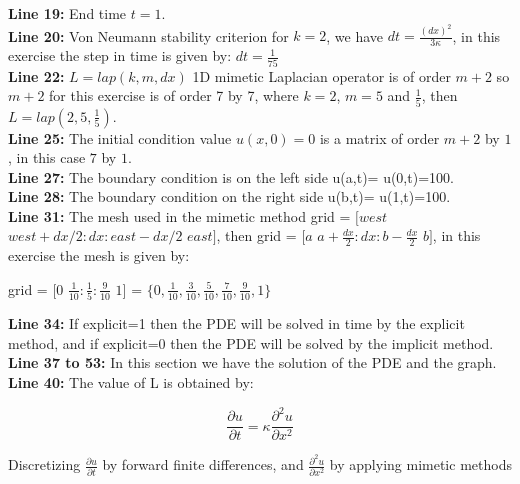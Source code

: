 \documentclass[a4paper,abstract=true]{scrreprt}
\begin{document}
\textbf{Line 19:} End time $t=1$.\\

\textbf{Line 20:} Von Neumann stability criterion for $k=2$, we have $ dt = \frac{(dx)^{2}}{3 \kappa}$, in this exercise the step in time is given by: $dt =\frac{1}{75}$\\

\textbf{Line 22:} $L = lap(k,m,dx)$ 1D mimetic Laplacian operator is of order $m+2$ so $m+2$ for this exercise is of order 7 by 7, where $k=2$, $m = 5$ and $\frac{1}{5}$, then $L = lap(2,5,\frac{1}{5})$.\\

\textbf{Line 25:} The initial condition  value $u(x,0)=0$ is a matrix of order $m+2$ by $1$, in this case $7$ by $1$.\\

\textbf{Line 27:} The boundary condition is on the left side u(a,t)= u(0,t)=100.\\

\textbf{Line 28:} The boundary condition on the right side u(b,t)= u(1,t)=100.\\

\textbf{Line 31:} The mesh used in the mimetic method  grid = $[west$  $west+dx/2: dx :east-dx/2$  $east]$, then grid = $[a$ $a+\frac{dx}{2}: dx : b-\frac{dx}{2}$ $b  ]$, in this exercise the mesh is given by:

\begin{center}

	grid = $[0$ $\frac{1}{10}: \frac{1}{5}: \frac{9}{10}$ $1]$ = $  \{0, \frac{1}{10}, \frac{3}{10}, \frac{5}{10}, \frac{7}{10}, \frac{9}{10}, 1 \}$

\end{center}

\textbf{Line 34:} If explicit=1 then the PDE will be solved in time by the explicit method, and if explicit=0 then the PDE will be solved by the implicit method.\\

\textbf{Line 37 to 53:} In this section we have the solution of the PDE and the graph. \\

\textbf{Line 40:} The value of L is obtained by:

\begin{equation}
	\frac{\partial u}{\partial t} = \kappa \frac{\partial^{2} u}{\partial x^{2}}
\end{equation}

Discretizing $\frac{\partial u}{\partial t}$ by forward finite differences, and $\frac{\partial^{2} u}{\partial x^{2}}$ by applying mimetic methods
\end{document}
